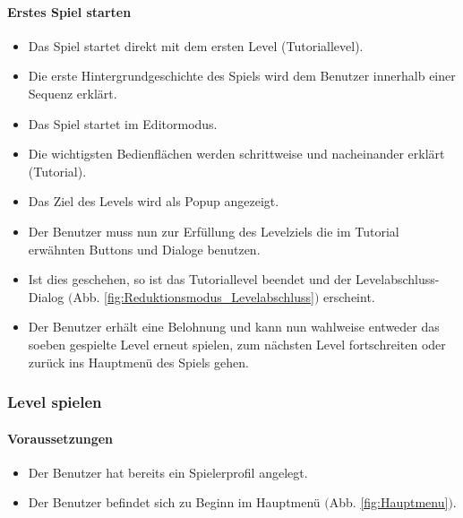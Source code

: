 \paragraph{Erstes Spiel starten}
\begin{itemize}
	\item Das Spiel startet direkt mit dem ersten Level (Tutoriallevel).
	\item Die erste Hintergrundgeschichte des Spiels wird dem Benutzer innerhalb einer Sequenz erklärt.
	\item Das Spiel startet im Editormodus.
	\item Die wichtigsten Bedienflächen werden schrittweise und nacheinander erklärt (Tutorial).
	\item Das Ziel des Levels wird als Popup angezeigt.
	\item Der Benutzer muss nun zur Erfüllung des Levelziels die im Tutorial erwähnten Buttons und Dialoge benutzen.
	\item Ist dies geschehen, so ist das Tutoriallevel beendet und der Levelabschluss-Dialog $($Abb. \ref{fig:Reduktionsmodus_Levelabschluss}$)$ erscheint.
	\item Der Benutzer erhält eine Belohnung und kann nun wahlweise entweder das soeben gespielte Level erneut spielen, zum nächsten Level fortschreiten oder zurück ins Hauptmenü des Spiels gehen.
\end{itemize}

\subsubsection{Level spielen}
\paragraph{Voraussetzungen}
\begin{itemize}
	\item Der Benutzer hat bereits ein Spielerprofil angelegt.
	\item Der Benutzer befindet sich zu Beginn im Hauptmenü $($Abb. \ref{fig:Hauptmenu}$)$.
\end{itemize}
